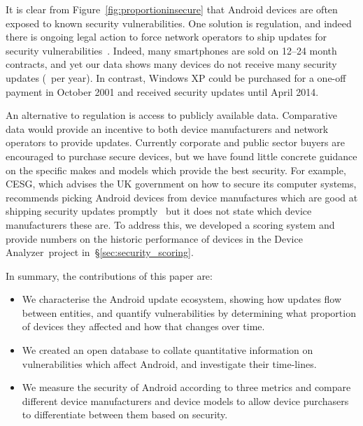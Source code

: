 \documentclass[conference,a4paper,twoside]{IEEEtran}
\let\OldTodo\todo
\renewcommand{\todo}{\OldTodo[inline]}
\newcommand{\todolater}[1]{}%
\newcommand{\da}{Device Analyzer}
\begin{document}
It is clear from Figure~\ref{fig:proportioninsecure} that Android devices are often exposed to known security vulnerabilities.
One solution is regulation, and indeed there is ongoing legal action to force network operators to ship updates for security vulnerabilities~\cite{Soghoian2013}.\todolater{Check on the status of this legal action}
Indeed, many smartphones are sold on 12--24 month contracts, and yet our data shows many devices do not receive many security updates (\daUpdatesPerYear\ per year). 
In contrast, Windows XP could be purchased for a one-off payment in October 2001 and received security updates until April 2014.

An alternative to regulation is access to publicly available data. 
Comparative data would provide an incentive to both device manufacturers and network operators to provide updates.
Currently corporate and public sector buyers are encouraged to purchase secure devices, but we have found little concrete guidance on the specific makes and models which provide the best security. 
For example, CESG, which advises the UK government on how to secure its computer systems, recommends picking Android devices from device manufactures which are good at shipping security updates promptly~\cite{CESG2013} but it does not state which device manufacturers these are.
To address this, we developed a scoring system and provide numbers on the historic performance of devices in the \da\ project in~\S\ref{sec:security_scoring}.

%

In summary, the contributions of this paper are:
\begin{itemize}
 \item We characterise the Android update ecosystem, showing how updates flow between entities, and quantify vulnerabilities by determining what proportion of devices they affected and how that changes over time.
 \item We created an open database to collate quantitative information on vulnerabilities which affect Android, and investigate their time-lines.
 \item We measure the security of Android according to three metrics and compare different device manufacturers and device models to allow device purchasers to differentiate between them based on security.
\end{itemize}
\end{document}
